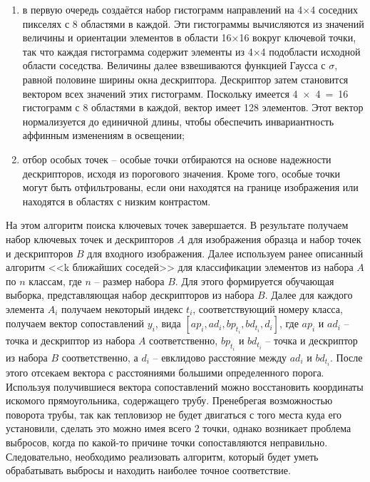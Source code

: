 \documentclass[14pt, a4paper]{extreport}
\begin{document}
\begin{enumerate}[label={\arabic*)}]
		\item в первую очередь создаётся набор гистограмм направлений на 4×4 соседних пикселях с 8 областями в каждой. Эти гистограммы вычисляются из значений величины и ориентации элементов в области 16×16 вокруг ключевой точки, так что каждая гистограмма содержит элементы из 4×4 подобласти исходной области соседства. Величины далее взвешиваются функцией Гаусса с $\sigma$, равной половине ширины окна дескриптора. Дескриптор затем становится вектором всех значений этих гистограмм. Поскольку имеется 4~×~4~=~16 гистограмм с 8 областями в каждой, вектор имеет 128 элементов. Этот вектор нормализуется до единичной длины, чтобы обеспечить инвариантность аффинным изменениям в освещении;
		
		\item отбор особых точек -- особые точки отбираются на основе надежности дескрипторов, исходя из порогового значения. Кроме того, особые точки могут быть отфильтрованы, если они находятся на границе изображения или находятся в областях с низким контрастом.
	\end{enumerate}
	
	На этом алгоритм поиска ключевых точек завершается. 
	В результате получаем набор ключевых точек и дескрипторов $A$ для изображения образца и набор точек и дескрипторов $B$ для входного изображения. Далее используем ранее описанный алгоритм <<k ближайших соседей>> для классификации элементов из набора $A$ по $n$ классам, где $n$ -- размер набора $B$. Для этого формируется обучающая выборка, представляющая набор дескрипторов из набора $B$. Далее для каждого элемента $A_i$ получаем некоторый индекс $t_i$, соответствующий номеру класса, получаем вектор сопоставлений $y_i$, вида $[ap_i, ad_i, bp_{t_i}, bd_{t_i}, d_i]$, где $ap_i$ и $ad_i$ -- точка и дескриптор из набора $A$ соответственно, $bp_{t_i}$ и $bd_{t_i}$ -- 
	точка и дескриптор из набора $B$ соответственно, а $d_i$ -- евклидово расстояние между $ad_i$ и $bd_{t_i}$. После этого отсекаем вектора с расстояниями большими определенного порога.
	Используя получившиеся вектора сопоставлений можно восстановить координаты искомого прямоугольника, содержащего трубу. Пренебрегая возможностью поворота трубы, так как тепловизор не будет двигаться с того места куда его установили, сделать это можно имея всего 2 точки, однако возникает проблема выбросов, когда по какой-то причине точки сопоставляются неправильно. Следовательно, необходимо реализовать алгоритм, который будет уметь обрабатывать выбросы и находить наиболее точное соответствие.
	
\end{document}
